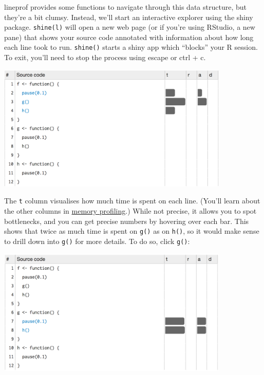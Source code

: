 \begin{Shaded}
\begin{Highlighting}[]
\NormalTok{(}\NormalTok{)}
\StringTok{ }\NormalTok{(}\NormalTok{())}
\end{Highlighting}
\end{Shaded}

lineprof provides some functions to navigate through this data
structure, but they're a bit clumsy. Instead, we'll start an interactive
explorer using the shiny package. \texttt{shine(l)} will open a new web
page (or if you're using RStudio, a new pane) that shows your source
code annotated with information about how long each line took to run.
\texttt{shine()} starts a shiny app which ``blocks'' your R session. To
exit, you'll need to stop the process using escape or ctrl + c.

\includegraphics[width=4.35in]{screenshots/profiling-lineprof-f.png}

The \texttt{t} column visualises how much time is spent on each line.
(You'll learn about the other columns in
\hyperref[memory-profiling]{memory profiling}.) While not precise, it
allows you to spot bottlenecks, and you can get precise numbers by
hovering over each bar. This shows that twice as much time is spent on
\texttt{g()} as on \texttt{h()}, so it would make sense to drill down
into \texttt{g()} for more details. To do so, click \texttt{g()}:

\includegraphics[width=4.35in]{screenshots/profiling-lineprof-g.png}

